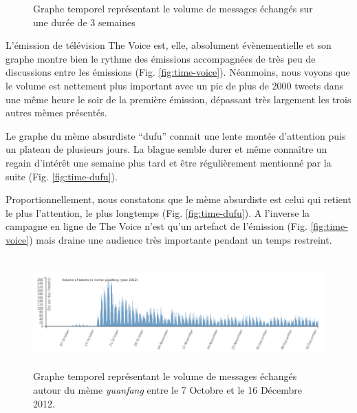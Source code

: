 \begin{figure}[ht]
{      \label{fig:time-qiegao}
    }
    \newline
    \caption{
      Graphe temporel repr\'esentant le volume de messages \'echang\'es sur une dur\'ee de 3 semaines    
    }
\end{figure}
\clearpage

L{\textquoteright}\'emission de t\'el\'evision The Voice est, elle, absolument \'ev\`enementielle et son graphe montre bien le rythme des \'emissions accompagn\'ees de tr\`es peu de discussions entre les \'emissions (Fig. \ref{fig:time-voice}). N\'eanmoins, nous voyons que le volume est nettement plus important avec un pic de plus de 2000 tweets dans une m\^eme heure le soir de la premi\`ere \'emission, d\'epassant tr\`es largement les trois autres m\`emes pr\'esent\'es.  

Le graphe du m\`eme absurdiste {\textquotedblleft}dufu{\textquotedblright} connait une lente mont\'ee d{\textquoteright}attention puis un plateau de plusieurs jours. La blague semble durer et m\^eme conna\^itre un regain d{\textquoteright}int\'er\^et une semaine plus tard et \^etre r\'eguli\`erement mentionn\'e par la suite (Fig. \ref{fig:time-dufu}).

Proportionnellement, nous constatons que le m\`eme absurdiste est celui qui retient le plus l{\textquoteright}attention, le plus longtemps (Fig. \ref{fig:time-dufu}). A l{\textquoteright}inverse la campagne en ligne de The Voice n{\textquoteright}est qu{\textquoteright}un artefact de l{\textquoteright}\'emission (Fig. \ref{fig:time-voice}) mais draine une audience tr\`es importante pendant un temps restreint. 

\begin{figure}[h!]
    \centering
    
  \includegraphics[width=6.0087in,height=1.6697in]{figures/chap4/chapitre4-img5.png}
  
  \caption{
   Graphe temporel repr\'esentant le volume de messages \'echang\'es  autour du m\`eme \textit{yuanfang} entre le 7 Octobre et le 16 D\'ecembre 2012.
  }
  \label{fig:time-yuanfang}
\end{figure}

